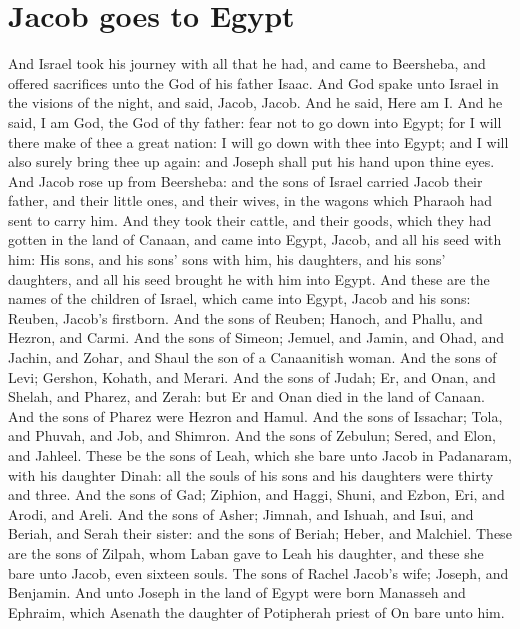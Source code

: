 \section*{Jacob goes to Egypt}
\begin{biblechapter} %
\verse And Israel took his journey with all that he had, and came to Beersheba, and offered sacrifices unto the God of his father Isaac.
\verse And God spake unto Israel in the visions of the night, and said, Jacob, Jacob. And he said, Here am I.
\verse And he said, I am God, the God of thy father: fear not to go down into Egypt; for I will there make of thee a great nation:
\verse I will go down with thee into Egypt; and I will also surely bring thee up again: and Joseph shall put his hand upon thine eyes.
\verse And Jacob rose up from Beersheba: and the sons of Israel carried Jacob their father, and their little ones, and their wives, in the wagons which Pharaoh had sent to carry him.
\verse And they took their cattle, and their goods, which they had gotten in the land of Canaan, and came into Egypt, Jacob, and all his seed with him:
\verse His sons, and his sons' sons with him, his daughters, and his sons' daughters, and all his seed brought he with him into Egypt.
\verse And these are the names of the children of Israel, which came into Egypt, Jacob and his sons: Reuben, Jacob's firstborn.
\verse And the sons of Reuben; Hanoch, and Phallu, and Hezron, and Carmi.
\verse And the sons of Simeon; Jemuel, and Jamin, and Ohad, and Jachin, and Zohar, and Shaul the son of a Canaanitish woman.
\verse And the sons of Levi; Gershon, Kohath, and Merari.
\verse And the sons of Judah; Er, and Onan, and Shelah, and Pharez, and Zerah: but Er and Onan died in the land of Canaan. And the sons of Pharez were Hezron and Hamul.
\verse And the sons of Issachar; Tola, and Phuvah, and Job, and Shimron.
\verse And the sons of Zebulun; Sered, and Elon, and Jahleel.
\verse These be the sons of Leah, which she bare unto Jacob in Padanaram, with his daughter Dinah: all the souls of his sons and his daughters were thirty and three.
\verse And the sons of Gad; Ziphion, and Haggi, Shuni, and Ezbon, Eri, and Arodi, and Areli.
\verse And the sons of Asher; Jimnah, and Ishuah, and Isui, and Beriah, and Serah their sister: and the sons of Beriah; Heber, and Malchiel.
\verse These are the sons of Zilpah, whom Laban gave to Leah his daughter, and these she bare unto Jacob, even sixteen souls.
\verse The sons of Rachel Jacob's wife; Joseph, and Benjamin.
\verse And unto Joseph in the land of Egypt were born Manasseh and Ephraim, which Asenath the daughter of Potipherah priest of On bare unto him.

\end{biblechapter}
